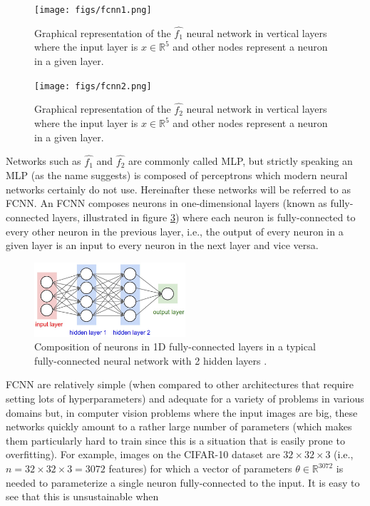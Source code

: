 \begin{figure}[ht]
    \centering
    \texttt{[image: figs/fcnn1.png]}
    \caption{Graphical representation of the $\hat{f_1}$ neural network in vertical layers where the input layer is $x \in \mathbb{R}^{5}$ and other nodes represent a neuron in a given layer.}
    \label{fig:fcnn1}
\end{figure}

\begin{figure}[ht]
    \centering
    \texttt{[image: figs/fcnn2.png]}
    \caption{Graphical representation of the $\hat{f_2}$ neural network in vertical layers where the input layer is $x \in \mathbb{R}^{5}$ and other nodes represent a neuron in a given layer.}
    \label{fig:fcnn2}
\end{figure}

Networks such as $\hat{f_1}$ and $\hat{f_2}$ are commonly called \ac{MLP}, but strictly speaking an \ac{MLP} (as the name suggests) is composed of perceptrons which modern neural networks certainly do not use. Hereinafter these networks will be referred to as \ac{FCNN}. An \ac{FCNN} composes neurons in one-dimensional layers (known as fully-connected layers, illustrated in figure \ref{fig:1dlayers}) where each neuron is fully-connected to every other neuron in the previous layer, i.e., the output of every neuron in a given layer is an input to every neuron in the next layer and vice versa.

\begin{figure}[ht]
    \centering
    \includegraphics[width=0.5\textwidth]{figs/1dlayers.png}
    \caption{Composition of neurons in 1D fully-connected layers in a typical fully-connected neural network with 2 hidden layers \cite{cs231n}.}
    \label{fig:1dlayers}
\end{figure}

\ac{FCNN} are relatively simple (when compared to other architectures that require setting lots of hyperparameters) and adequate for a variety of problems in various domains but, in computer vision problems where the input images are big, these networks quickly amount to a rather large number of parameters (which makes them particularly hard to train since this is a situation that is easily prone to overfitting). For example, images on the CIFAR-10 \cite{cifar10} dataset are $32 \times 32 \times 3$ (i.e., $n = 32 \times 32 \times 3 = 3072$ features) for which a vector of parameters $\theta \in \mathbb{R}^{3072}$ is needed to parameterize a single neuron fully-connected to the input. It is easy to see that this is unsustainable when

